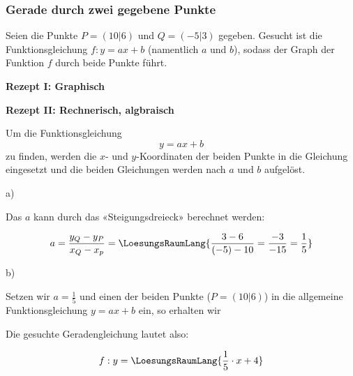 \subsubsection{Gerade durch zwei gegebene Punkte}

Seien die Punkte $P=(10|6)$ und $Q=(-5|3)$ gegeben.
Gesucht ist die Funktionsgleichung $f: y=ax+b$ (namentlich $a$ und $b$), sodass
der Graph der Funktion $f$ durch beide Punkte führt.


\textbf{Rezept I: Graphisch}\\

\vspace{1mm}


\newpage

\textbf{Rezept II: Rechnerisch, algbraisch }\\

\vspace{1mm}

\begin{rezept}{}{}
Um die Funktionsgleichung $$y=ax+b$$ zu finden,
  werden die $x$- und $y$-Koordinaten der beiden Punkte in die Gleichung eingesetzt und die beiden Gleichungen werden nach $a$ und $b$ aufgelöst. 
\end{rezept}

a)

Das $a$ kann durch das «Steigungsdreieck» berechnet werden:

$$a = \frac{y_Q-y_P}{x_Q-x_p} = \LoesungsRaumLang{\frac{3 - 6}{(-5) - 10} = \frac{-3}{-15} = \frac{1}{5}}$$

b)

Setzen wir $a=\frac{1}{5}$ und einen der beiden Punkte (\zB $P=(10|6)$) in die
allgemeine Funktionsgleichung $y=ax+b$ ein, so erhalten wir


Die gesuchte Geradengleichung lautet also:

$$f: y=\LoesungsRaumLang{\frac{1}{5}\cdot{}x + 4}$$

